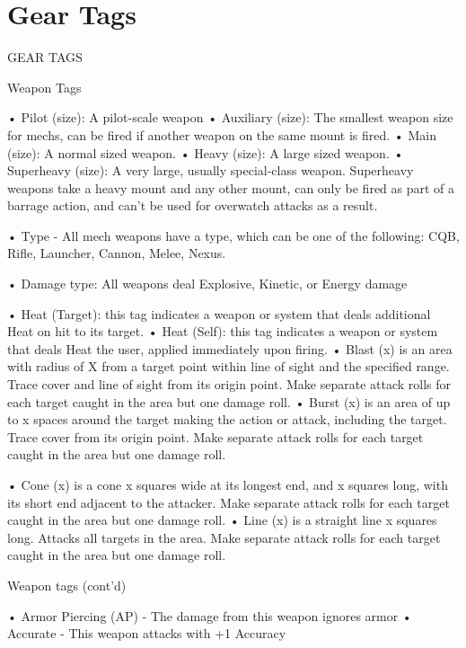\section{Gear Tags}

      GEAR TAGS

Weapon Tags

•  \hypertarget{Pilot}{Pilot (size)}: A pilot-scale weapon
•  \hypertarget{Auxiliary}{Auxiliary (size)}: The smallest weapon size for mechs, can be fired if another weapon on the
  same mount is fired.
•  \hypertarget{Main}{Main (size)}: A normal sized weapon.
•  \hypertarget{Heavy}{Heavy (size)}: A large sized weapon.
•  \hypertarget{Superheavy}{Superheavy (size)}: A very large, usually special-class weapon. Superheavy weapons take a
  heavy mount and any other mount, can only be fired as part of a barrage action, and can’t be
  used for overwatch attacks as a result.

•  \hypertarget{Type}{Type} - All mech weapons have a type, which can be one of the following: CQB, Rifle,
  Launcher, Cannon, Melee, Nexus.

•  \hypertarget{DamageType}{Damage type}: All weapons deal Explosive, Kinetic, or Energy damage


•  \hypertarget{HeatTarget}{Heat (Target)}: this tag indicates a weapon or system that deals additional Heat on hit to its
  target.
•  Heat (Self): this tag indicates a weapon or system that deals Heat the user, applied immediately upon firing.
•  \hypertarget{Blast}{Blast (x)} is an area with radius of X from a target point within line of sight and the specified
  range. Trace cover and line of sight from its origin point. Make separate attack rolls for each
  target caught in the area but one damage roll.
•  \hypertarget{Burst}{Burst (x)} is an area of up to x spaces around the target making the action or attack, including
  the target. Trace cover from its origin point. Make separate attack rolls for each target caught in
  the area but one damage roll.

•  \hypertarget{Cone}{Cone (x)} is a cone x squares wide at its longest end, and x squares long, with its short end
  adjacent to the attacker. Make separate attack rolls for each target caught in the area but one
  damage roll.
•  \hypertarget{Line}{Line (x)} is a straight line x squares long. Attacks all targets in the area. Make separate attack
  rolls for each target caught in the area but one damage roll.

Weapon tags (cont’d)

•  \hypertarget{AP}{Armor Piercing (AP)} - The damage from this weapon ignores armor
•  \hypertarget{Accurate}{Accurate} - This weapon attacks with +1 Accuracy

